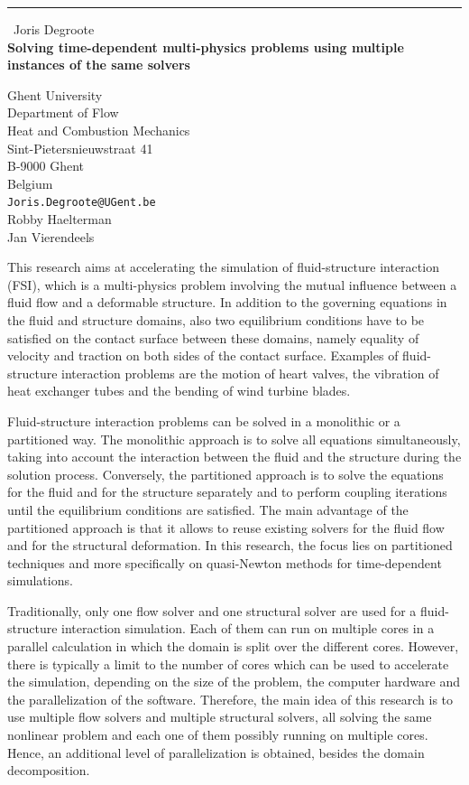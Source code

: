 \documentclass{report}
\begin{document}
\begin{center}
\rule{6in}{1pt} \
{\large Joris Degroote \\
{\bf Solving time-dependent multi-physics problems using multiple instances of the same solvers}}

Ghent University \\ Department of Flow \\ Heat and Combustion Mechanics \\ Sint-Pietersnieuwstraat 41 \\ B-9000 Ghent \\ Belgium
\\
{\tt Joris.Degroote@UGent.be}\\
Robby Haelterman\\
Jan Vierendeels\end{center}

This research aims at accelerating the simulation of fluid-structure
interaction (FSI), which is a multi-physics problem involving the mutual
influence between a fluid flow and a deformable structure. In addition to
the governing equations in the fluid and structure domains, also two
equilibrium conditions have to be satisfied on the contact surface
between these domains, namely equality of velocity and traction on both
sides of the contact surface. Examples of fluid-structure interaction
problems are the motion of heart valves, the vibration of heat exchanger
tubes and the bending of wind turbine blades.

Fluid-structure interaction problems can be solved in a monolithic or a
partitioned way. The monolithic approach is to solve all equations
simultaneously, taking into account the interaction between the fluid and
the structure during the solution process. Conversely, the partitioned
approach is to solve the equations for the fluid and for the structure
separately and to perform coupling iterations until the equilibrium
conditions are satisfied. The main advantage of the partitioned approach
is that it allows to reuse existing solvers for the fluid flow and for
the structural deformation. In this research, the focus lies on
partitioned techniques and more specifically on quasi-Newton methods for
time-dependent simulations.

Traditionally, only one flow solver and one structural solver are used
for a fluid-structure interaction simulation. Each of them can run on
multiple cores in a parallel calculation in which the domain is split
over the different cores. However, there is typically a limit to the
number of cores which can be used to accelerate the simulation, depending
on the size of the problem, the computer hardware and the parallelization
of the software. Therefore, the main idea of this research is to use
multiple flow solvers and multiple structural solvers, all solving the
same nonlinear problem and each one of them possibly running on multiple
cores. Hence, an additional level of parallelization is obtained, besides
the domain decomposition.
\end{document}
